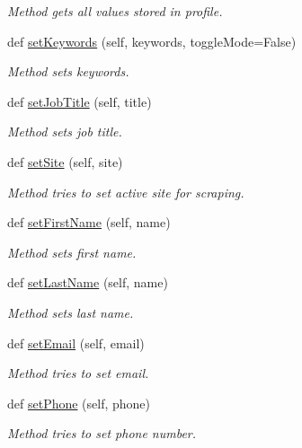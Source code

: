 \begin{DoxyCompactItemize}
\begin{DoxyCompactList}\small\item\em Method gets all values stored in profile. \end{DoxyCompactList}\item 
def \hyperlink{classuserProfile_1_1userProfile_ad1e2dc6aedf50cba360f2bc6669ea3f9}{set\+Keywords} (self, keywords, toggle\+Mode=False)
\begin{DoxyCompactList}\small\item\em Method sets keywords. \end{DoxyCompactList}\item 
def \hyperlink{classuserProfile_1_1userProfile_aa8d7bc0df8fb26fe203b8c6459cd403c}{set\+Job\+Title} (self, title)
\begin{DoxyCompactList}\small\item\em Method sets job title. \end{DoxyCompactList}\item 
def \hyperlink{classuserProfile_1_1userProfile_a67fc7d06910ee0cb4914884dff2ef28e}{set\+Site} (self, site)
\begin{DoxyCompactList}\small\item\em Method tries to set active site for scraping. \end{DoxyCompactList}\item 
def \hyperlink{classuserProfile_1_1userProfile_aafd4f084d296a83fb1ac2ff703aaa251}{set\+First\+Name} (self, name)
\begin{DoxyCompactList}\small\item\em Method sets first name. \end{DoxyCompactList}\item 
def \hyperlink{classuserProfile_1_1userProfile_ab6c77d7b146fbf8d9ffb79ae0d6a2c00}{set\+Last\+Name} (self, name)
\begin{DoxyCompactList}\small\item\em Method sets last name. \end{DoxyCompactList}\item 
def \hyperlink{classuserProfile_1_1userProfile_a6420f8a55919d59d5d357b9ed93cb279}{set\+Email} (self, email)
\begin{DoxyCompactList}\small\item\em Method tries to set email. \end{DoxyCompactList}\item 
def \hyperlink{classuserProfile_1_1userProfile_af57b152c37a8ce53368166751893e0b3}{set\+Phone} (self, phone)
\begin{DoxyCompactList}\small\item\em Method tries to set phone number. \end{DoxyCompactList}\item 

\end{DoxyCompactItemize}
